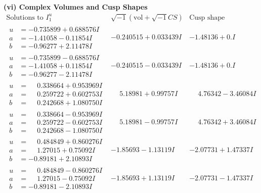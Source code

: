 \documentclass[1p]{elsarticle_modified}
\theoremstyle{definition}
\newcommand{\I}{\sqrt{-1}}
\begin{document}
\newpage\flushleft \textbf{(vi) Complex Volumes and Cusp Shapes}
$$\begin{array}{c|c|c}  
\text{Solutions to }I^u_{1}& \I (\text{vol} + \sqrt{-1}CS) & \text{Cusp shape}\\
 \hline 
\begin{aligned}
u &= -0.735899 + 0.688576 I \\
a &= -1.41058 - 0.11854 I \\
b &= -0.96277 + 2.11478 I\end{aligned}
 & -0.240515 + 0.033439 I & -1.48136 + 0. I\phantom{ +0.000000I} \\ \hline\begin{aligned}
u &= -0.735899 - 0.688576 I \\
a &= -1.41058 + 0.11854 I \\
b &= -0.96277 - 2.11478 I\end{aligned}
 & -0.240515 - 0.033439 I & -1.48136 + 0. I\phantom{ +0.000000I} \\ \hline\begin{aligned}
u &= \phantom{-}0.338664 + 0.953969 I \\
a &= \phantom{-}0.259722 + 0.602753 I \\
b &= \phantom{-}0.242668 + 1.080750 I\end{aligned}
 & \phantom{-}5.18981 + 0.99757 I & \phantom{-}4.76342 - 3.46084 I \\ \hline\begin{aligned}
u &= \phantom{-}0.338664 - 0.953969 I \\
a &= \phantom{-}0.259722 - 0.602753 I \\
b &= \phantom{-}0.242668 - 1.080750 I\end{aligned}
 & \phantom{-}5.18981 - 0.99757 I & \phantom{-}4.76342 + 3.46084 I \\ \hline\begin{aligned}
u &= \phantom{-}0.484849 + 0.860276 I \\
a &= \phantom{-}1.27015 + 0.75092 I \\
b &= -0.89181 + 2.10893 I\end{aligned}
 & -1.85693 - 1.13119 I & -2.07731 + 1.47337 I \\ \hline\begin{aligned}
u &= \phantom{-}0.484849 - 0.860276 I \\
a &= \phantom{-}1.27015 - 0.75092 I \\
b &= -0.89181 - 2.10893 I\end{aligned}
 & -1.85693 + 1.13119 I & -2.07731 - 1.47337 I \\ \hline\begin{aligned}

\end{aligned}
\end{array}$$
\end{document}
